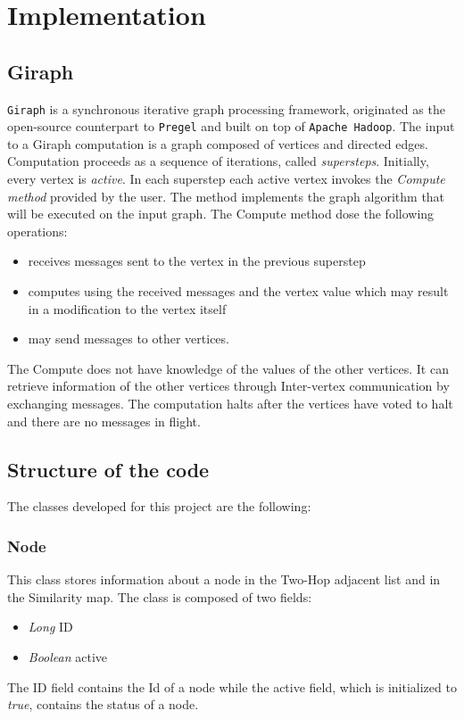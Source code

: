 \documentclass[12pt]{article}
\begin{document}
\section{Implementation}
\subsection{Giraph}
\texttt{Giraph} is a synchronous iterative graph processing framework, originated as the open-source counterpart to \texttt{Pregel} and built on top of \texttt{Apache Hadoop}.
The input to a Giraph computation is a graph composed of vertices and directed edges. Computation proceeds as a sequence of iterations, called \emph{supersteps}. Initially, every vertex is \emph{active}. In each superstep each active vertex invokes the \emph{Compute method} provided by the user. The method implements the graph algorithm that will be executed on the input graph.
The Compute method dose the following operations:
\begin{itemize}
    \item receives messages sent to the vertex in the previous superstep
    \item computes using the received messages and the vertex value which may result in a modification to the vertex itself
    \item may send messages to other vertices.
\end{itemize}
    The Compute does not have knowledge of the values of the other vertices. It can retrieve information of the other vertices through Inter-vertex communication by exchanging messages.
    The computation halts after the vertices have voted to halt and there are no messages in flight.
\subsection{Structure of the code}
The classes developed for this project are the following:
\subsubsection{Node}
    This class stores information about a node in the Two-Hop adjacent list and in the Similarity map.
    The class is composed of two fields:
    \begin{itemize}
            \item \emph{Long} ID
            \item \emph{Boolean} active
    \end{itemize}
    The ID field contains the Id of a node while the active field, which is initialized to \emph{true}, contains the status of a node.
\end{document}
